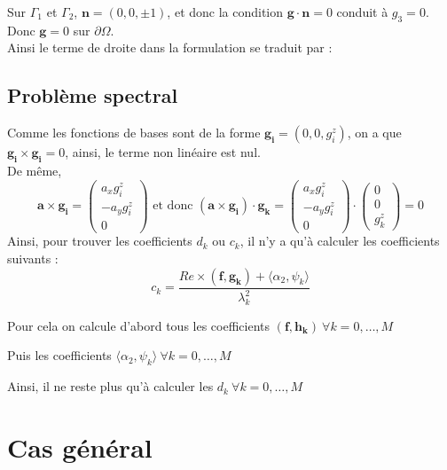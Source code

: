 Sur $\Gamma_1$ et $\Gamma_2$, $\bm{n}=(0,0,\pm 1)$, et donc la condition $\bm{g}\cdot \bm{n}=0$ conduit à $g_3 = 0$.\\
Donc $\bm{g}=0$ sur $\partial\Omega$.\\

Ainsi le terme de droite dans la formulation se traduit par :


\subsection{Problème spectral}
\label{impZPS}

Comme les fonctions de bases sont de la forme $\bm{g_i}=(0,0,g_i^z)$, on a que $\bm{g_i}\times\bm{g_i}=0$, ainsi, le terme non linéaire est nul.\\

De même, 
\[
\bm{a}\times\bm{g_i}=\begin{pmatrix}
a_xg_i^z\\
-a_yg_i^z\\
0
\end{pmatrix}
\text{ et donc }
(\bm{a}\times\bm{g_i})\cdot\bm{g_k} = \begin{pmatrix}
a_xg_i^z\\
-a_yg_i^z\\
0
\end{pmatrix}\cdot\begin{pmatrix}
0\\
0\\
g_k^z
\end{pmatrix} = 0
\]
Ainsi, pour trouver les coefficients $d_k$ ou $c_k$, il n'y a qu'à calculer les coefficients suivants :
\[
c_k = \frac{Re\times (\bm{f},\bm{g_k})+\langle \alpha_2,\psi_k\rangle}{\lambda_k^2}
\]

Pour cela on calcule d'abord tous les coefficients $(\bm{f},\bm{h_k})\ \forall k=0,\dots,M$


Puis les coefficients $\langle\alpha_2,\psi_k\rangle\ \forall k=0,\dots,M$


Ainsi, il ne reste plus qu'à calculer les $d_k\ \forall k=0,\dots,M$


\section{Cas général}


